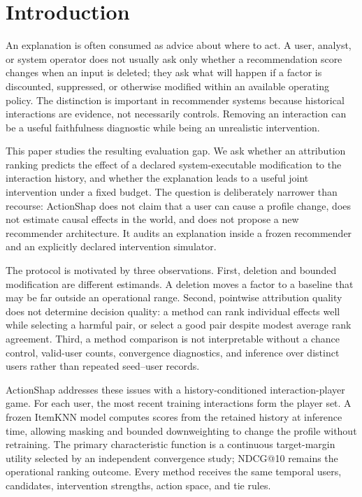 \documentclass[pdflatex,sn-mathphys-num]{sn-jnl}
\theoremstyle{thmstyleone}
\theoremstyle{thmstyletwo}
\theoremstyle{thmstylethree}
\begin{document}

\maketitle

\section{Introduction}
An explanation is often consumed as advice about where to act. A user, analyst, or system operator does not usually ask only whether a recommendation score changes when an input is deleted; they ask what will happen if a factor is discounted, suppressed, or otherwise modified within an available operating policy. The distinction is important in recommender systems because historical interactions are evidence, not necessarily controls. Removing an interaction can be a useful faithfulness diagnostic while being an unrealistic intervention.

This paper studies the resulting evaluation gap. We ask whether an attribution ranking predicts the effect of a declared system-executable modification to the interaction history, and whether the explanation leads to a useful joint intervention under a fixed budget. The question is deliberately narrower than recourse: ActionShap does not claim that a user can cause a profile change, does not estimate causal effects in the world, and does not propose a new recommender architecture. It audits an explanation inside a frozen recommender and an explicitly declared intervention simulator.

The protocol is motivated by three observations. First, deletion and bounded modification are different estimands. A deletion moves a factor to a baseline that may be far outside an operational range. Second, pointwise attribution quality does not determine decision quality: a method can rank individual effects well while selecting a harmful pair, or select a good pair despite modest average rank agreement. Third, a method comparison is not interpretable without a chance control, valid-user counts, convergence diagnostics, and inference over distinct users rather than repeated seed--user records.

ActionShap addresses these issues with a history-conditioned interaction-player game. For each user, the most recent training interactions form the player set. A frozen ItemKNN model computes scores from the retained history at inference time, allowing masking and bounded downweighting to change the profile without retraining. The primary characteristic function is a continuous target-margin utility selected by an independent convergence study; NDCG@10 remains the operational ranking outcome. Every method receives the same temporal users, candidates, intervention strengths, action space, and tie rules.
\end{document}
